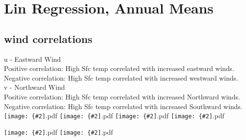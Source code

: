 \documentclass[12pt,a4paper]{article}
\newcommand{\pdffig}[2][0.5]{\texttt{[image: \{\#2]}.pdf}}
\begin{document}
\section{Lin Regression, Annual Means}
\subsection{wind correlations}
u - Eastward Wind\\
Positive correlation: High Sfc temp correlated with increased eastward winds.\\
Negative correlation: High Sfc temp correlated with increased westward winds.\\
v - Northward Wind\\
Positive correlation: High Sfc temp correlated with increased Northward winds.\\
Negative correlation: High Sfc temp correlated with increased Southward winds.\\
\pdffig[0.5]{Lin_Regression_Aus_tsfc_u_hig}
\pdffig[0.5]{Lin_Regression_Aus_tsfc_u_low}
\pdffig[0.5]{Lin_Regression_Aus_tsfc_v_high}
\pdffig[0.5]{Lin_Regression_Aus_tsfc_v_low}

\pdffig{Lin_Regression_Aus_tsfc_u_low.amip.ens2}
\pdffig{Lin_Regression_Aus_tsfc_v_low.amip.ens2}
\end{document}
